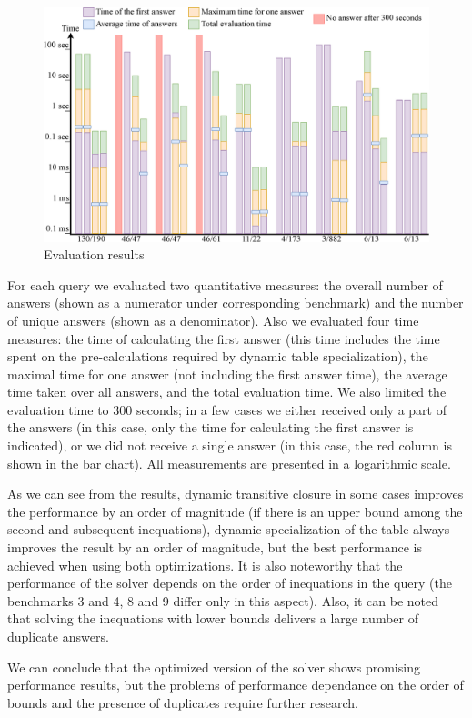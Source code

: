 \begin{figure}[t]
  \includegraphics[width=1\textwidth]{eval_diagram.eps}
  \caption{Evaluation results}
  \label{fig:eval-diagram}
\end{figure}

 For each query we evaluated two quantitative measures: the overall number of answers (shown as a numerator
under corresponding benchmark) and the number of unique answers (shown as a denominator). Also we evaluated four time measures: the time of calculating the first answer (this time includes the time
spent on the pre-calculations required by dynamic table specialization), the maximal time for one answer (not including the first answer time), the average time taken over all answers,
and the total evaluation time. We also limited the evaluation time to 300 seconds; in a few cases we either received only a part of the answers (in this case, only the time for
calculating the first answer is indicated), or we did not receive a single answer (in this case, the red column is shown in the bar chart). All measurements are presented in a logarithmic
scale.

As we can see from the results, dynamic transitive closure in some cases improves the performance by an order of magnitude (if there is an upper bound among the
second and subsequent inequations), dynamic specialization of the table always improves the result by an order of magnitude, but the best performance is achieved when using both optimizations.
It is also noteworthy that the performance of the solver depends on the order of inequations in the query (the benchmarks 3 and 4, 8 and 9 differ only in this aspect). Also, it can be noted that
solving the inequations with lower bounds delivers a large number of duplicate answers.

We can conclude that the optimized version of the solver shows promising performance results, but the problems of performance dependance on the order of bounds and
the presence of duplicates require further research.

